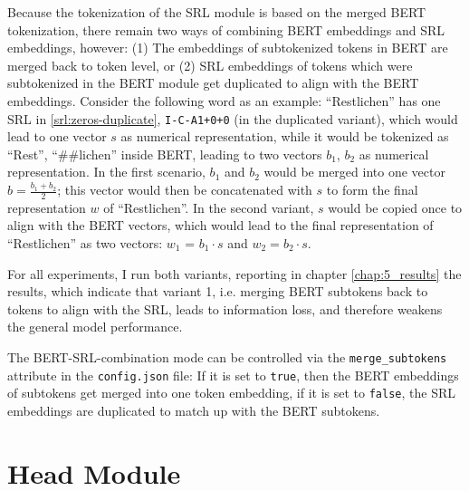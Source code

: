 Because the tokenization of the SRL module is based on the merged BERT tokenization,
there remain two ways of combining BERT embeddings and SRL embeddings, however: (1) The
embeddings of subtokenized tokens in BERT are merged back to token level, or (2) SRL
embeddings of tokens which were subtokenized in the BERT module get duplicated to align
with the BERT embeddings. Consider the following word as an example: ``Restlichen'' has one
SRL in \ref{srl:zeros-duplicate}, \texttt{I-C-A1+0+0} (in the duplicated variant), which
would lead to one vector $s$ as numerical representation, while it would be tokenized as
``Rest'', ``\#\#lichen'' inside BERT, leading to two vectors $b_1$, $b_2$ as numerical
representation. In the first scenario, $b_1$ and $b_2$ would be merged into one vector
$b = \frac{b_1 + b_2}{2}$; this vector would then be concatenated
with $s$ to form the final representation $w$ of ``Restlichen''. In the second variant,
$s$ would be copied once to align with the BERT vectors, which would lead
to the final representation of ``Restlichen'' as two vectors: $w_1$ = $b_1 \cdot s$ and
$w_2 = b_2 \cdot s$.

For all experiments, I run both variants, reporting in chapter \ref{chap:5_results} the results,
which indicate that variant 1, i.e. merging BERT subtokens back to tokens to align with the SRL,
leads to information loss, and therefore weakens the general model performance.

\begin{tcolorbox}[
  colback=blue!5!white,
  colframe=blue!75!black,
  title={\centering Code}]

  The BERT-SRL-combination mode can be controlled via the \texttt{merge\_subtokens} attribute
  in the \texttt{config.json} file: If it is set to \texttt{true}, then the BERT
  embeddings of subtokens get merged into one token embedding, if it is set to
  \texttt{false}, the SRL embeddings are duplicated to match up with the BERT
  subtokens.
\end{tcolorbox}


\section{Head Module}

